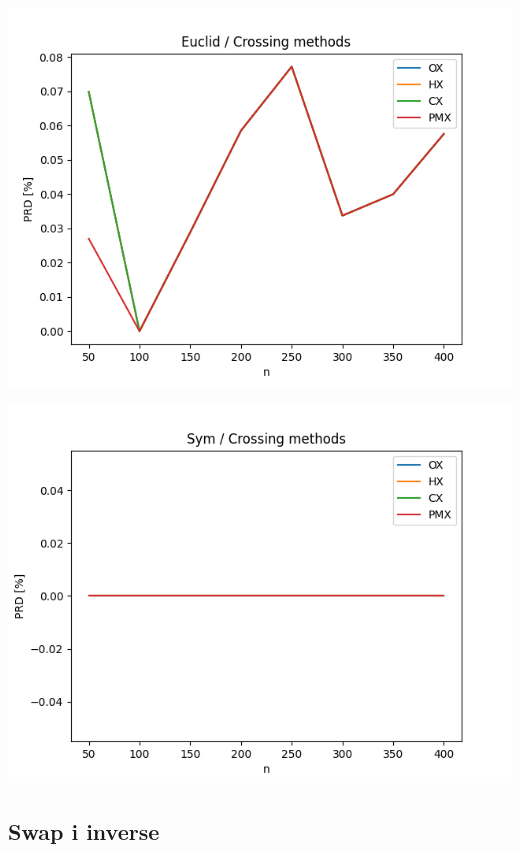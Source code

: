 \documentclass{article}
\begin{document}
\begin{center}
\includegraphics[width=\textwidth, 
                   height = 0.4\textheight, 
                   keepaspectratio]
                  {plots/euclid_5_crossing} 
\end{center}

\begin{center}
\includegraphics[width=\textwidth, 
                   height = 0.4\textheight, 
                   keepaspectratio]
                  {plots/sym_5_crossing} 
\end{center}


\subsection{Swap i inverse}
\end{document}
